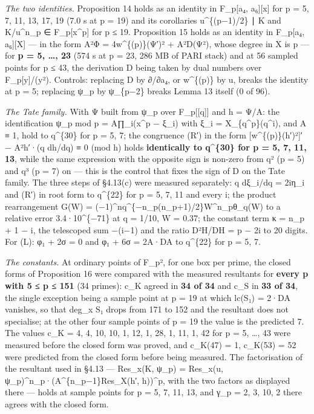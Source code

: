 \documentclass[11pt,a4paper]{article}
\theoremstyle{named}
\begin{document}
\textit{The two identities.} Proposition 14 holds as an identity in F\_p[a₄, a₆][x] for p = 5, 7, 11, 13, 17, 19 (7.0 s at p = 19) and its corollaries u\textasciicircum{}\{(p−1)/2\} ∣ K and K/u\textasciicircum{}n\_p ∈ F\_p[x\textasciicircum{}p] for p ≤ 19. Proposition 15 holds as an identity in F\_p[a₄, a₆][X] — in the form A²Φ = 4w\textasciicircum{}\{(p)\}(Ψ′)² + A²D(Ψ²), whose degree in X is p — for \textbf{p = 5, …, 23} (574 s at p = 23, 286 MB of PARI stack) and at 56 sampled points for p ≤ 43, the derivation D being taken by dual numbers over F\_p[y]/(y²). Controls: replacing D by ∂/∂a₄, or w\textasciicircum{}\{(p)\} by u, breaks the identity at p = 5; replacing ψ\_p by ψ\_\{p−2\} breaks Lemma 13 itself (0 of 96).

\textit{The Tate family.} With Ψ built from ψ\_p over F\_p[[q]] and h = Ψ/A: the identification ψ\_p mod p = A∏\_i(x\textasciicircum{}p − ξ\_i) with ξ\_i = X\_\{q\textasciicircum{}p\}(q\textasciicircum{}i), and A ≡ 1, hold to q\textasciicircum{}\{30\} for p = 5, 7; the congruence (R′) in the form [w\textasciicircum{}\{(p)\}(h′)²]′ − A²h′·(q dh/dq) ≡ 0 (mod h) holds \textbf{identically to q\textasciicircum{}\{30\} for p = 5, 7, 11, 13}, while the same expression with the opposite sign is non-zero from q² (p = 5) and q³ (p = 7) on — this is the control that fixes the sign of D on the Tate family. The three steps of §4.13(c) were measured separately: q dξ\_i/dq = 2iη\_i and (R′) in root form to q\textasciicircum{}\{22\} for p = 5, 7, 11 and every i; the product rearrangement G(W) = (−1)\textasciicircum{}nq\textasciicircum{}\{−n\_p(n\_p+1)/2\}W\textasciicircum{}n\_pθ\_q(W) to a relative error 3.4·10\textasciicircum{}\{−71\} at q = 1/10, W = 0.37; the constant term κ = n\_p + 1 − i, the telescoped sum −(i−1) and the ratio D²H/DH = p − 2i to 20 digits. For (L): φ₁ + 2σ = 0 and φ₁ + 6σ = 2A·DA to q\textasciicircum{}\{22\} for p = 5, 7.

\textit{The constants.} At ordinary points of F\_p², for one box per prime, the closed forms of Proposition 16 were compared with the measured resultants for \textbf{every p with 5 ≤ p ≤ 151} (34 primes): c\_K agreed in \textbf{34 of 34} and c\_S in \textbf{33 of 34}, the single exception being a sample point at p = 19 at which lc(S₁) = 2·DA vanishes, so that deg\_x S₁ drops from 171 to 152 and the resultant does not specialise; at the other four sample points of p = 19 the value is the predicted 7. The values c\_K = 4, 4, 10, 10, 1, 12, 1, 28, 1, 11, 1, 42 for p = 5, …, 43 were measured before the closed form was proved, and c\_K(47) = 1, c\_K(53) = 52 were predicted from the closed form before being measured. The factorisation of the resultant used in §4.13 — Res\_x(K, ψ\_p) = Res\_x(u, ψ\_p)\textasciicircum{}n\_p·(A\textasciicircum{}\{n\_p−1\}Res\_X(h′, h))\textasciicircum{}p, with the two factors as displayed there — holds at sample points for p = 5, 7, 11, 13, and γ\_p = 2, 3, 10, 2 there agrees with the closed form.
\end{document}
